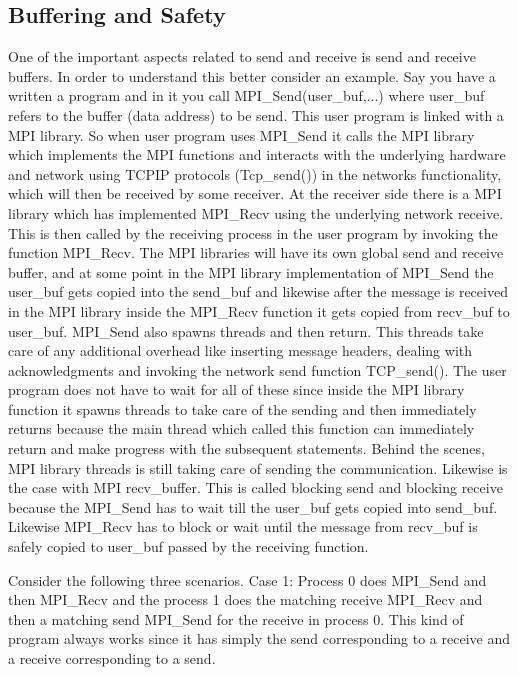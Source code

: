\documentclass[12pt]{article}
\begin{document}
\subsection{Buffering and Safety}
One of the important aspects related to send and receive is send and receive buffers. In order to understand this better consider an example. Say you have a written a program and in it you call MPI\_Send(user\_buf,...) where user\_buf refers to the buffer (data address) to be send. This user program is linked with a MPI library. So when user program uses MPI\_Send it calls the MPI library which implements the MPI functions and interacts with the underlying hardware and network using TCPIP protocols (Tcp\_send()) in the networks functionality, which will then be received by some receiver. At the receiver side there is a MPI library which has implemented MPI\_Recv using the underlying network receive. This is then called by the receiving process in the user program by invoking the function MPI\_Recv. The MPI libraries will have its own global send and receive buffer, and at some point in the MPI library implementation of MPI\_Send the user\_buf gets copied into the send\_buf and likewise after the message is received in the MPI library inside the MPI\_Recv function it gets copied from recv\_buf to user\_buf. MPI\_Send also spawns threads and then return. This threads take care of any additional overhead like inserting message headers, dealing with acknowledgments and invoking the network send function TCP\_send(). The user program does not have to wait for all of these since inside the MPI library function it spawns threads to take care of the sending and then immediately returns because the main thread which called this function can immediately return and make progress with the subsequent statements. Behind the scenes, MPI library threads is still taking care of sending the communication. Likewise is the case with MPI recv\_buffer. This is called blocking send and blocking receive because the MPI\_Send has to wait till the user\_buf gets copied into send\_buf. Likewise MPI\_Recv has to block or wait until the message from recv\_buf is safely copied to user\_buf passed by the receiving function.

Consider the following three scenarios.
Case 1: Process 0 does MPI\_Send and then MPI\_Recv and the process 1 does the matching receive MPI\_Recv and then a matching send MPI\_Send for the receive in process 0. This kind of program always works since it has simply the send corresponding to a receive and a receive corresponding to a send. 
\end{document}
